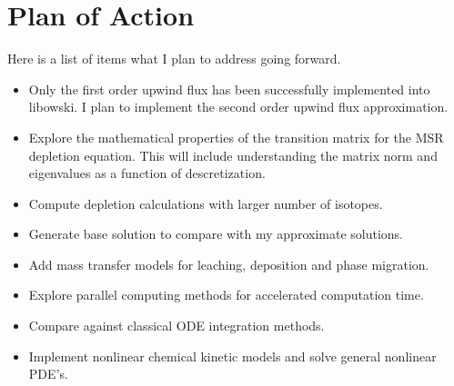 \chapter{Plan of Action} \label{ch:planOfAction}

Here is a list of items what I plan to address going forward.

\begin{itemize}
    \item Only the first order upwind flux has been successfully implemented into libowski. I plan to implement the second order upwind flux approximation.
    \item Explore the mathematical properties of the transition matrix for the MSR depletion equation. This will include understanding the matrix norm and eigenvalues as a function of descretization. 
    \item Compute depletion calculations with larger number of isotopes. 
    \item Generate base solution to compare with my approximate solutions.
    \item Add mass transfer models for leaching, deposition and phase migration.
    \item Explore parallel computing methods for accelerated computation time.
    \item Compare against classical ODE integration methods.
    \item Implement nonlinear chemical kinetic models and solve general nonlinear PDE's. 
\end{itemize}
